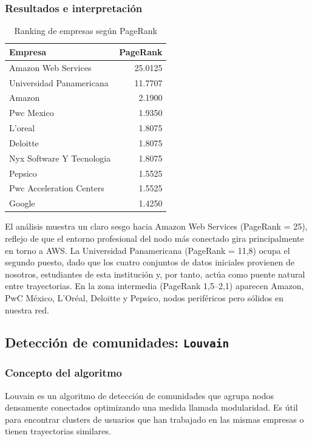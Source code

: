 \documentclass[10pt]{article}
\begin{document}
\subsubsection*{Resultados e interpretación}
\begin{table}[ht]
	\centering
	\begin{tabular}{|l|r|}
		\hline
		\textbf{Empresa}          & \textbf{PageRank} \\
		\hline
		Amazon Web Services       & 25.0125           \\
		Universidad Panamericana  & 11.7707           \\
		Amazon                    & 2.1900            \\
		Pwc Mexico                & 1.9350            \\
		L'oreal                   & 1.8075            \\
		Deloitte                  & 1.8075            \\
		Nyx Software Y Tecnologia & 1.8075            \\
		Pepsico                   & 1.5525            \\
		Pwc Acceleration Centers  & 1.5525            \\
		Google                    & 1.4250            \\
		\hline
	\end{tabular}
	\caption{Ranking de empresas según PageRank}
\end{table}

El análisis muestra un claro sesgo hacia Amazon Web Services (PageRank = 25), reflejo de que el entorno profesional del nodo más conectado gira principalmente en torno a AWS. La Universidad Panamericana (PageRank = 11,8) ocupa el segundo puesto, dado que los cuatro conjuntos de datos iniciales provienen de nosotros, estudiantes de esta institución y, por tanto, actúa como puente natural entre trayectorias. En la zona intermedia (PageRank 1,5–2,1) aparecen Amazon, PwC México, L’Oréal, Deloitte y Pepsico, nodos periféricos pero sólidos en nuestra red.

\subsection{Detección de comunidades: \texttt{Louvain}}

\subsubsection*{Concepto del algoritmo}
Louvain es un algoritmo de detección de comunidades que agrupa nodos densamente conectados optimizando una medida llamada modularidad. Es útil para encontrar clusters de usuarios que han trabajado en las mismas empresas o tienen trayectorias similares.
\end{document}
